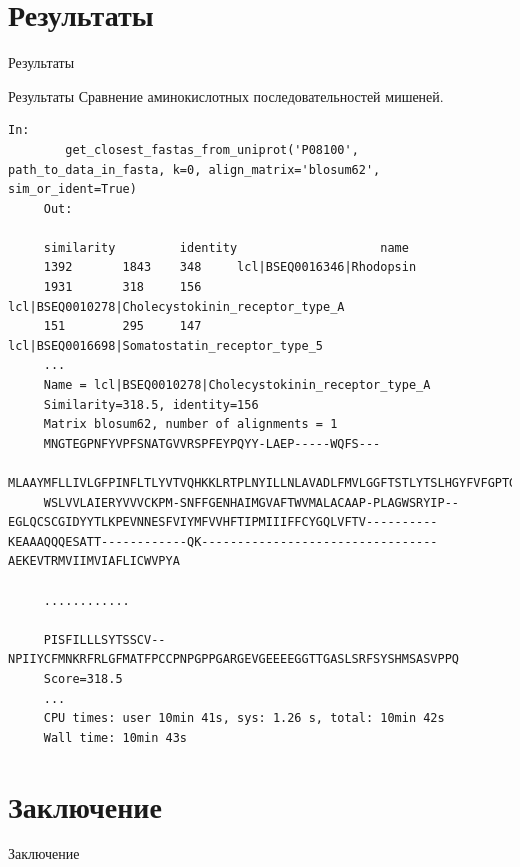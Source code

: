 \documentclass[14pt]{beamer}
\begin{document}
\section{Результаты}
 \begin{frame}{Результаты}
 \end{frame}{Результаты}
 \small
 	Сравнение аминокислотных последовательностей мишеней.
     \begin{lstlisting}[label={lst:fasta}, basicstyle=\tiny]
     In:
     	get_closest_fastas_from_uniprot('P08100', path_to_data_in_fasta, k=0, align_matrix='blosum62', sim_or_ident=True)
     Out:
     
     similarity 		identity 					name
     1392 	 	1843 	348  	lcl|BSEQ0016346|Rhodopsin
     1931 	 	318 	156 	lcl|BSEQ0010278|Cholecystokinin_receptor_type_A
     151 	 	295 	147 	lcl|BSEQ0016698|Somatostatin_receptor_type_5
     ...
     Name = lcl|BSEQ0010278|Cholecystokinin_receptor_type_A
     Similarity=318.5, identity=156
     Matrix blosum62, number of alignments = 1
     MNGTEGPNFYVPFSNATGVVRSPFEYPQYY-LAEP-----WQFS---
     MLAAYMFLLIVLGFPINFLTLYVTVQHKKLRTPLNYILLNLAVADLFMVLGGFTSTLYTSLHGYFVFGPTGCNLEGFFATLGGEIAL	
     WSLVVLAIERYVVVCKPM-SNFFGENHAIMGVAFTWVMALACAAP-PLAGWSRYIP--EGLQCSCGIDYYTLKPEVNNESFVIYMFVVHFTIPMIIIFFCYGQLVFTV----------KEAAAQQQESATT------------QK---------------------------------AEKEVTRMVIIMVIAFLICWVPYA
     
     ............
     
     PISFILLLSYTSSCV--NPIIYCFMNKRFRLGFMATFPCCPNPGPPGARGEVGEEEEGGTTGASLSRFSYSHMSASVPPQ
     Score=318.5
     ...
     CPU times: user 10min 41s, sys: 1.26 s, total: 10min 42s
     Wall time: 10min 43s
     \end{lstlisting}

\section{Заключение}
\begin{frame}{Заключение}
	
\end{frame}
\end{document}
